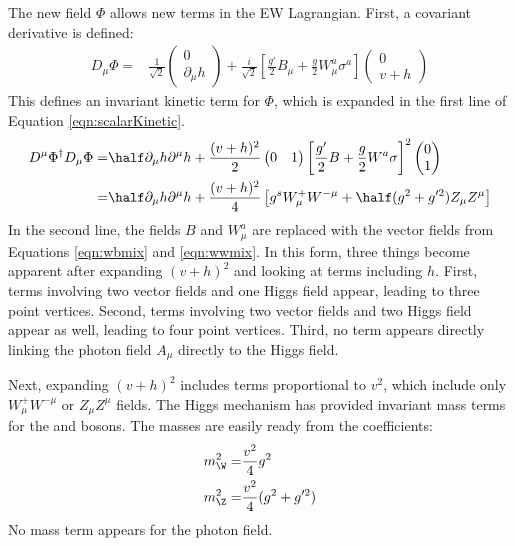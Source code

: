 The new field $\Phi$ allows new terms in the EW Lagrangian.
First, a covariant derivative is defined:
\begin{equation}\begin{split}
        D_\mu\Phi=&\frac{1}{\sqrt{2}}\begin{pmatrix}0\\\partial_\mu h\end{pmatrix}+\frac{i}{\sqrt{2}}\left[\frac{g'}{2}B_\mu+\frac{g}{2}W_\mu^a\sigma^a\right] \begin{pmatrix}0\\v+h\end{pmatrix}
\end{split}\end{equation} 
This defines an invariant kinetic term for $\Phi$, which is expanded in the first line of Equation \ref{eqn:scalarKinetic}.
\begin{equation}\begin{split}\label{eqn:scalarKinetic}
    D^\mu\Phi^\dagger D_\mu\Phi =& \half\partial_\mu h\partial^\mu h+\frac{(v+h)^2}{2}\begin{pmatrix}0&1\end{pmatrix}\left[\frac{g'}{2}B+\frac{g}{2}W^a\sigma\right]^2\begin{pmatrix}0\\1\end{pmatrix} \\
    =& \half\partial_\mu h\partial^\mu h+\frac{(v+h)^2}{4}\left[g^sW^+_\mu W^{-\mu}+\half(g^2+g'^2)Z_\mu Z^\mu\right] \\
\end{split}\end{equation} 
In the second line, the fields $B$ and $W_\mu^a$ are replaced with the vector fields from Equations \ref{eqn:wbmix} and \ref{eqn:wwmix}.
In this form, three things become apparent after expanding $(v+h)^2$ and looking at terms including $h$.
First, terms involving two vector fields and one Higgs field appear, leading to three point vertices.
Second, terms involving two vector fields and two Higgs field appear as well, leading to four point vertices.
Third, no term appears directly linking the photon field $A_\mu$ directly to the Higgs field.

Next, expanding $(v+h)^2$ includes terms proportional to $v^2$, which include only $W^+_\mu W^{-\mu}$ or $Z_\mu Z^\mu$ fields.
The Higgs mechanism has provided invariant mass terms for the \Z and \W bosons.
The masses are easily ready from the coefficients:
\begin{equation}\begin{split}
m_{\W}^2=&\frac{v^2}{4}g^2 \\
m_{\Z}^2=&\frac{v^2}{4}(g^2+g'^2) \\
\end{split}\end{equation} 
No mass term appears for the photon field.

